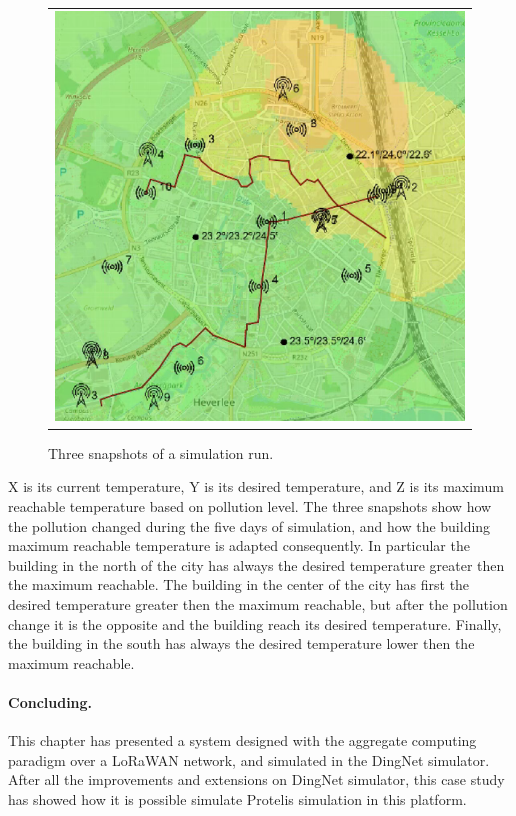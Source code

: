 \begin{figure}[h]
\begin{tabular}{ll}
    \end{tabular}
    \begin{tabular}{c}
         \includegraphics[scale=0.42]{figures/simACsnap3s.png} 
    \end{tabular}
    \caption{Three snapshots of a simulation run.}
    \label{fig:simAC}
\end{figure}
% 
X is its current temperature, Y is its desired temperature, and Z is its maximum reachable temperature based on pollution level.
The three snapshots show how the pollution changed during the five days of simulation, and how the building maximum reachable temperature is adapted consequently.
In particular the building in the north of the city has always the desired temperature greater then the maximum reachable. 
The building in the center of the city has first the desired temperature greater then the maximum reachable, but after the pollution change it is the opposite and the building reach its desired temperature.
Finally, the building in the south has always the desired temperature lower then the maximum reachable.

\paragraph{Concluding.} This chapter has presented a system designed with the aggregate computing paradigm over a LoRaWAN network, and simulated in the DingNet simulator.
After all the improvements and extensions on DingNet simulator, this case study has showed how it is possible simulate Protelis simulation in this platform. 

